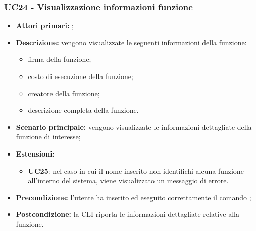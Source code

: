 \subsubsection{UC24 - Visualizzazione informazioni funzione}
\begin{itemize}
	\item \textbf{Attori primari:} \ua{};
	\item \textbf{Descrizione:} vengono visualizzate le seguenti informazioni della funzione:
	\begin{itemize}
		\item firma della funzione;
		\item costo di esecuzione della funzione; 
		\item creatore della funzione; 
		\item descrizione completa della funzione.
	\end{itemize} 
	\item \textbf{Scenario principale:} vengono visualizzate le informazioni  dettagliate della funzione di interesse;
	\item \textbf{Estensioni: }
	\begin{itemize}
		\item \textbf{UC25}: nel caso in cui il nome inserito non identifichi alcuna funzione all'interno del sistema, viene visualizzato un messaggio di errore.
	\end{itemize}
	\item \textbf{Precondizione:} l’utente ha inserito ed eseguito correttamente il comando \pinfo{}; 
	\item \textbf{Postcondizione:} la CLI riporta le informazioni dettagliate relative alla funzione. 
\end{itemize}
